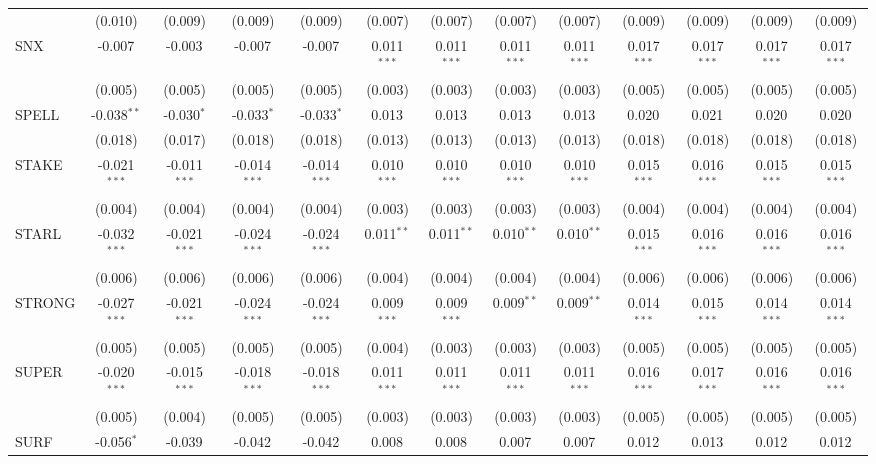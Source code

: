 \begin{table}[!htbp]
\begin{tabular}{@{\extracolsep{5pt}}lcccccccccccc}
  & (0.010) & (0.009) & (0.009) & (0.009) & (0.007) & (0.007) & (0.007) & (0.007) & (0.009) & (0.009) & (0.009) & (0.009) \\
 SNX & -0.007$^{}$ & -0.003$^{}$ & -0.007$^{}$ & -0.007$^{}$ & 0.011$^{***}$ & 0.011$^{***}$ & 0.011$^{***}$ & 0.011$^{***}$ & 0.017$^{***}$ & 0.017$^{***}$ & 0.017$^{***}$ & 0.017$^{***}$ \\
  & (0.005) & (0.005) & (0.005) & (0.005) & (0.003) & (0.003) & (0.003) & (0.003) & (0.005) & (0.005) & (0.005) & (0.005) \\
 SPELL & -0.038$^{**}$ & -0.030$^{*}$ & -0.033$^{*}$ & -0.033$^{*}$ & 0.013$^{}$ & 0.013$^{}$ & 0.013$^{}$ & 0.013$^{}$ & 0.020$^{}$ & 0.021$^{}$ & 0.020$^{}$ & 0.020$^{}$ \\
  & (0.018) & (0.017) & (0.018) & (0.018) & (0.013) & (0.013) & (0.013) & (0.013) & (0.018) & (0.018) & (0.018) & (0.018) \\
 STAKE & -0.021$^{***}$ & -0.011$^{***}$ & -0.014$^{***}$ & -0.014$^{***}$ & 0.010$^{***}$ & 0.010$^{***}$ & 0.010$^{***}$ & 0.010$^{***}$ & 0.015$^{***}$ & 0.016$^{***}$ & 0.015$^{***}$ & 0.015$^{***}$ \\
  & (0.004) & (0.004) & (0.004) & (0.004) & (0.003) & (0.003) & (0.003) & (0.003) & (0.004) & (0.004) & (0.004) & (0.004) \\
 STARL & -0.032$^{***}$ & -0.021$^{***}$ & -0.024$^{***}$ & -0.024$^{***}$ & 0.011$^{**}$ & 0.011$^{**}$ & 0.010$^{**}$ & 0.010$^{**}$ & 0.015$^{***}$ & 0.016$^{***}$ & 0.016$^{***}$ & 0.016$^{***}$ \\
  & (0.006) & (0.006) & (0.006) & (0.006) & (0.004) & (0.004) & (0.004) & (0.004) & (0.006) & (0.006) & (0.006) & (0.006) \\
 STRONG & -0.027$^{***}$ & -0.021$^{***}$ & -0.024$^{***}$ & -0.024$^{***}$ & 0.009$^{***}$ & 0.009$^{***}$ & 0.009$^{**}$ & 0.009$^{**}$ & 0.014$^{***}$ & 0.015$^{***}$ & 0.014$^{***}$ & 0.014$^{***}$ \\
  & (0.005) & (0.005) & (0.005) & (0.005) & (0.004) & (0.003) & (0.003) & (0.003) & (0.005) & (0.005) & (0.005) & (0.005) \\
 SUPER & -0.020$^{***}$ & -0.015$^{***}$ & -0.018$^{***}$ & -0.018$^{***}$ & 0.011$^{***}$ & 0.011$^{***}$ & 0.011$^{***}$ & 0.011$^{***}$ & 0.016$^{***}$ & 0.017$^{***}$ & 0.016$^{***}$ & 0.016$^{***}$ \\
  & (0.005) & (0.004) & (0.005) & (0.005) & (0.003) & (0.003) & (0.003) & (0.003) & (0.005) & (0.005) & (0.005) & (0.005) \\
 SURF & -0.056$^{*}$ & -0.039$^{}$ & -0.042$^{}$ & -0.042$^{}$ & 0.008$^{}$ & 0.008$^{}$ & 0.007$^{}$ & 0.007$^{}$ & 0.012$^{}$ & 0.013$^{}$ & 0.012$^{}$ & 0.012$^{}$ \\

\end{tabular}
\end{table}
